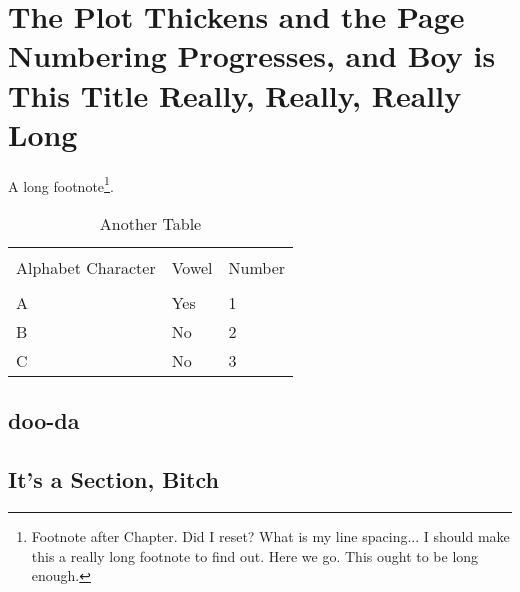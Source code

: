 \chapter{The Plot Thickens and the Page Numbering Progresses, and Boy is This Title Really, Really, Really Long}

\lipsum[1] A long footnote\footnote{Footnote after Chapter. Did I
  reset? What is my line spacing... I should make this a really long
  footnote to find out.  Here we go. \lipsum[1] This ought to be long
  enough.}.
\begin{table}
\begin{center}
\begin{tabular}{lll}
\hline
\\[3pt]
Alphabet Character & Vowel & Number \\[3pt]
\hline
\\[3pt]
A & Yes & 1 \\
B & No & 2 \\
C & No & 3 \\[3pt]
\hline
\end{tabular}
\label{tbl3}
\caption{Another Table}
\end{center}
\end{table}

\lipsum
\section{doo-da}

\lipsum[2-6]
\section{It's a Section, Bitch}

\lipsum
